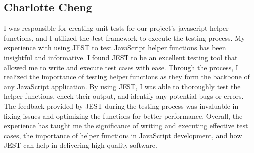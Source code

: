 \documentclass[12pt, titlepage]{article}
\begin{document}
\subsection{Charlotte Cheng}
I was responsible for creating unit tests for our project's javascript helper functions, and I utilized the Jest framework to execute the testing process. My experience with using JEST to test JavaScript helper functions has been insightful and informative. I found JEST to be an excellent testing tool that allowed me to write and execute test cases with ease. Through the process, I realized the importance of testing helper functions as they form the backbone of any JavaScript application. By using JEST, I was able to thoroughly test the helper functions, check their output, and identify any potential bugs or errors. The feedback provided by JEST during the testing process was invaluable in fixing issues and optimizing the functions for better performance. Overall, the experience has taught me the significance of writing and executing effective test cases, the importance of helper functions in JavaScript development, and how JEST can help in delivering high-quality software.
\end{document}
